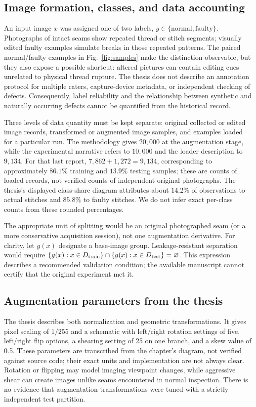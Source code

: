 \documentclass[conference,a4paper]{IEEEtran}
\begin{document}
\subsection{Image formation, classes, and data accounting}
An input image $x$ was assigned one of two labels, $y\in\{\text{normal},\text{faulty}\}$. Photographs of intact seams show repeated thread or stitch segments; visually edited faulty examples simulate breaks in those repeated patterns. The paired normal/faulty examples in Fig.~\ref{fig:samples} make the distinction observable, but they also expose a possible shortcut: altered pictures can contain editing cues unrelated to physical thread rupture. The thesis does not describe an annotation protocol for multiple raters, capture-device metadata, or independent checking of defects. Consequently, label reliability and the relationship between synthetic and naturally occurring defects cannot be quantified from the historical record.

Three levels of data quantity must be kept separate: original collected or edited image records, transformed or augmented image samples, and examples loaded for a particular run. The methodology gives $20{,}000$ at the augmentation stage, while the experimental narrative refers to $10{,}000$ and the loader description to $9{,}134$. For that last report, $7{,}862+1{,}272=9{,}134$, corresponding to approximately $86.1\%$ training and $13.9\%$ testing samples; these are counts of loaded records, not verified counts of independent original photographs. The thesis's displayed class-share diagram attributes about $14.2\%$ of observations to actual stitches and $85.8\%$ to faulty stitches. We do not infer exact per-class counts from these rounded percentages.

The appropriate unit of splitting would be an original photographed seam (or a more conservative acquisition session), not one augmentation derivative. For clarity, let $g(x)$ designate a base-image group. Leakage-resistant separation would require $\{g(x):x\in D_{\rm train}\}\cap\{g(x):x\in D_{\rm test}\}=\varnothing$. This expression describes a recommended validation condition; the available manuscript cannot certify that the original experiment met it.\par

\subsection{Augmentation parameters from the thesis}
The thesis describes both normalization and geometric transformations. It gives pixel scaling of $1/255$ and a schematic with left/right rotation settings of five, left/right flip options, a shearing setting of 25 on one branch, and a skew value of 0.5. These parameters are transcribed from the chapter's diagram, not verified against source code; their exact units and implementation are not always clear. Rotation or flipping may model imaging viewpoint changes, while aggressive shear can create images unlike seams encountered in normal inspection. There is no evidence that augmentation transformations were tuned with a strictly independent test partition.
\end{document}

